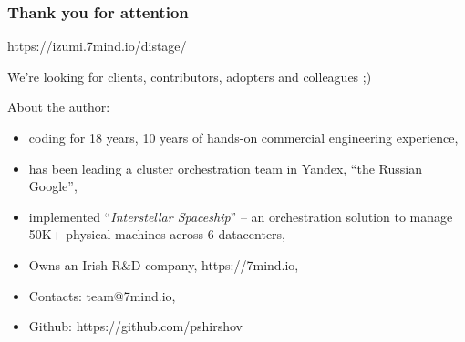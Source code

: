 \documentclass[usenames,dvipsnames]{beamer}
\begin{document}
\begin{frame}
    \frametitle{Thank you for attention}

    \begin{center}
      https://izumi.7mind.io/distage/

      We're looking for clients, contributors, adopters and colleagues ;)
    \end{center}

    About the author:
    \begin{itemize}
        \item coding for 18 years, 10 years of hands-on commercial engineering experience,
        \item has been leading a cluster orchestration team in Yandex, ``the Russian Google'',
        \item implemented ``\textit{Interstellar Spaceship}'' -- an orchestration solution to manage 50K+ physical machines across 6 datacenters,
        \item Owns an Irish R\&D company, https://7mind.io,
        \item Contacts: team@7mind.io,
        \item Github: https://github.com/pshirshov
    \end{itemize}
\end{frame}
\end{document}
